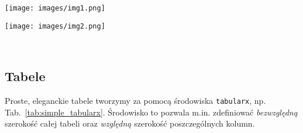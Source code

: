 \documentclass[pdftex,11pt,a4paper]{article}
\begin{document}
\begin{figure*}
	\newlength{\figlwidth}  %
	\newlength{\figrwidth}  %
	\setlength{\figlwidth}{.4\linewidth}
	\setlength{\figrwidth}{\linewidth - \figlwidth}  %

	\setlength{\imgheight}{3cm}
	
	\setlength{\captionmargin}{0.5cm}
	
	\centering
	\begin{minipage}[b]{\figlwidth}
		\centering
		\texttt{[image: images/img1.png]}
	\end{minipage}%
	\hspace*{0.2cm}
	\begin{minipage}[b]{\figrwidth}
		\centering
		\texttt{[image: images/img2.png]}
	\end{minipage}\\[-4pt]  %
	\begin{minipage}[t]{\figlwidth}
		\centering
		\caption{Lewa ilustracja.}
		\label{fig:minipage_figl}
	\end{minipage}%
	\hspace*{0.2cm}
	\begin{minipage}[t]{\figrwidth}
		\centering
		\cprotect\caption{Prawa ilustracja zawiera dłuższy podpis. Należy ustawić wartość długości \lstinline|\captionmargin| tak, aby się on nie rozjeżdżał.}
		\label{fig:minipage_figr}
	\end{minipage}%
	\hspace*{0.3cm}
\end{figure*}

\subsection{Tabele}
\label{sub:tables}

Proste, eleganckie tabele tworzymy za pomocą środowiska \texttt{tabularx}, np. Tab.~\ref{tab:simple_tabularx}. Środowisko to pozwala m.in. zdefiniować \textit{bezwzględną} szerokość całej tabeli oraz \textit{względną} szerokość poszczególnych kolumn.
\end{document}
